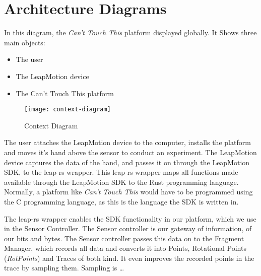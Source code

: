 \documentclass{standalone}
\begin{document}


  \section{Architecture Diagrams}
  In this diagram, the \textit{Can't Touch This} platform displayed globally. It
  Shows three main objects:
  \begin{itemize}
    \tightlist{}
    \item The user
    \item The LeapMotion device
    \item The Can't Touch This platform
  \end{itemize}
  \begin{figure}[h]
    \caption{Context Diagram}
    \centering
    \texttt{[image: context-diagram]}
  \end{figure}
  The user attaches the LeapMotion device to the computer, installs the platform
  and moves it's hand above the sensor to conduct an experiment. The LeapMotion
  device captures the data of the hand, and passes it on through the LeapMotion
  SDK, to the leap-rs wrapper. This leap-rs wrapper maps all functions made
  available through the LeapMotion SDK to the Rust programming language.
  Normally, a platform like \textit{Can't Touch This} would have to be
  programmed using the C programming language, as this is the language the SDK
  is written in.

  The leap-rs wrapper enables the SDK functionality in our platform, which we
  use in the Sensor Controller. The Sensor controller is our gateway of
  information, of our bits and bytes. The Sensor controller passes this data on
  to the Fragment Manager, which records all data and converts it into Points,
  Rotational Points (\textit{RotPoints}) and Traces of both kind. It even
  improves the recorded points in the trace by sampling them. Sampling is
  \ldots{}
\end{document}
